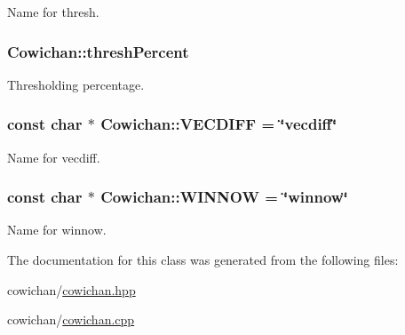 Name for thresh. \hypertarget{class_cowichan_a42c0ae639cc3ac124a013bc3e3162ad}{
\subsubsection[{threshPercent}]{ {\bf Cowichan::threshPercent}}}
\label{class_cowichan_a42c0ae639cc3ac124a013bc3e3162ad}


Thresholding percentage. \hypertarget{class_cowichan_d70f851efe3d20a89d7bcf5e7db70344}{
\subsubsection[{VECDIFF}]{\setlength{\rightskip}{0pt plus 5cm}const char $\ast$ {\bf Cowichan::VECDIFF} = \char`\"{}vecdiff\char`\"{}}}
\label{class_cowichan_d70f851efe3d20a89d7bcf5e7db70344}


Name for vecdiff. \hypertarget{class_cowichan_a4d4acfeeb50c0552487a59a58b3f962}{
\subsubsection[{WINNOW}]{\setlength{\rightskip}{0pt plus 5cm}const char $\ast$ {\bf Cowichan::WINNOW} = \char`\"{}winnow\char`\"{}}}
\label{class_cowichan_a4d4acfeeb50c0552487a59a58b3f962}


Name for winnow. 

The documentation for this class was generated from the following files:\begin{CompactItemize}
\item 
cowichan/\hyperlink{cowichan_8hpp}{cowichan.hpp}\item 
cowichan/\hyperlink{cowichan_8cpp}{cowichan.cpp}\end{CompactItemize}

